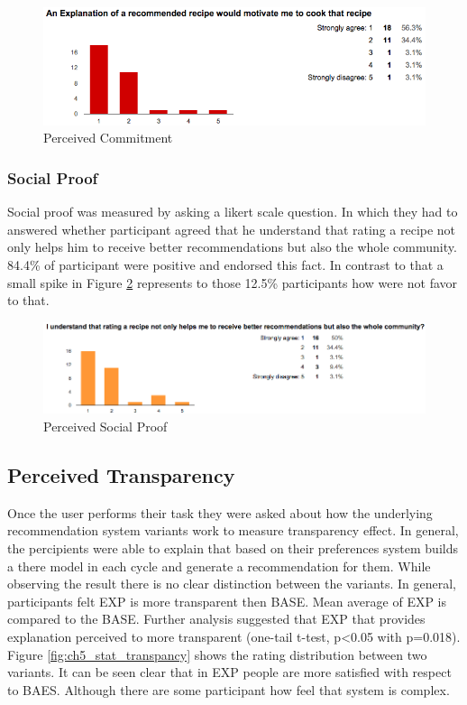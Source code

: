 \begin{figure}[h]
	\centering
	\includegraphics[width=1\linewidth]{figures/ch5_stat_commitment}
	\caption{Perceived Commitment}
	\label{fig:ch5_commitment}
\end{figure}

\subsubsection{Social Proof}

Social proof was measured by asking a likert scale question. In which they had to answered whether participant agreed that he understand that rating a recipe not only helps him to receive better recommendations but also the whole community. 84.4\% of participant were positive and endorsed this fact. In contrast to that a small spike in Figure \ref{fig:ch5_stat_social_proof} represents to those 12.5\% participants how were not favor to that. 

\begin{figure}[h]
\centering
\includegraphics[width=1\linewidth]{figures/ch5_stat_social_proof.png}
\caption{Perceived Social Proof}
\label{fig:ch5_stat_social_proof}
\end{figure}

\subsection{Perceived Transparency}

Once the user performs their task they were asked about how the underlying recommendation system variants work to measure transparency effect. In general, the percipients were able to explain that based on their preferences system builds a there model in each cycle and generate a recommendation for them.  While observing the result there is no clear distinction between the variants. In general, participants felt EXP is more transparent then BASE.  Mean average of EXP is  compared to  the BASE. Further analysis suggested that EXP that provides explanation perceived to more transparent (one-tail t-test, p<0.05 with p=0.018). Figure \ref{fig:ch5_stat_transpancy} shows the rating distribution between two variants. It can be seen clear that in EXP people are more satisfied with respect to BAES. Although there are some participant how feel that system is complex. 


